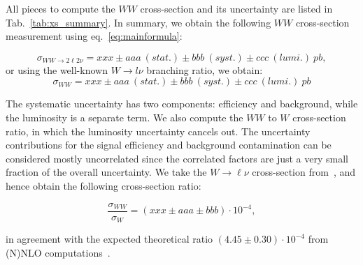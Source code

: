All pieces to compute the $WW$ cross-section and its
uncertainty are listed in Tab.~\ref{tab:xs_summary}.
In summary, we obtain the following $WW$ cross-section measurement using
eq.~\ref{eq:mainformula}:

\begin{equation*}
\sigma_{WW \to 2\ell 2\nu}  = xxx \pm aaa~(stat.) \pm bbb~(syst.) \pm ccc~(lumi.)~pb,
\end{equation*}
or using the well-known $W \to l \nu$ branching ratio, we obtain:
\begin{equation*}
\sigma_{WW}  = xxx \pm aaa~(stat.) \pm bbb~(syst.) \pm ccc~(lumi.)~pb
\end{equation*}

The systematic uncertainty has two components: efficiency and background,
while the luminosity is a separate term. We also compute the $WW$ to $W$
cross-section ratio, in which the luminosity
uncertainty cancels out. The uncertainty contributions for the signal
efficiency and background contamination can be considered mostly uncorrelated
since the correlated factors are just a very small fraction of the
overall uncertainty. We take the $W \to \ell \nu$ cross-section
from~\cite{VBTFCrossSectionNote}, and hence obtain the following cross-section
ratio:

\begin{equation*}
\frac{\sigma_{WW}}{\sigma_{W}} = (xxx \pm aaa \pm bbb) \cdot 10^{-4},
\end{equation*}

in agreement with the expected theoretical ratio
$(4.45 \pm 0.30) \cdot 10^{-4}$ from (N)NLO
computations~\cite{Melnikov:2006kv, Melnikov:2006di,MCFM}.



